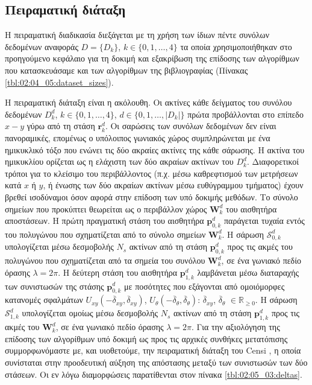 \subsection{Πειραματική διάταξη}
\label{subsection:02_05_03:01}

Η πειραματική διαδικασία διεξάγεται με τη χρήση των ίδιων πέντε συνόλων
δεδομένων αναφοράς $D = \{D_k\}$, $k \in \{0,1,\dots,4\}$ τα οποία
χρησιμοποιήθηκαν στο προηγούμενο κεφάλαιο για τη δοκιμή και εξακρίβωση της
επίδοσης των αλγορίθμων που κατασκευάσαμε και των αλγορίθμων της βιβλιογραφίας
(Πίνακας \ref{tbl:02:04_05:dataset_sizes}).

Η πειραματική διάταξη είναι η ακόλουθη. Οι ακτίνες κάθε δείγματος του συνόλου
δεδομένων $D_k^d$, $k \in \{0,1,\dots,4\}$, $d \in \{0,1,\dots,|D_k|\}$ πρώτα
προβάλλονται στο επίπεδο $x-y$ γύρω από τη στάση $\bm{r}_k^d$. Οι σαρώσεις των
συνόλων δεδομένων δεν είναι πανοραμικές, επομένως ο υπόλοιπος γωνιακός χώρος
συμπληρώνεται με ένα ημικυκλικό τόξο που ενώνει τις δύο ακραίες ακτίνες της
κάθε σάρωσης. Η ακτίνα του ημικυκλίου ορίζεται ως η ελάχιστη των δύο ακραίων
ακτίνων του $D_k^d$. Διαφορετικοί τρόποι για το κλείσιμο του περιβάλλοντος
(π.χ.  μέσω καθρεφτισμού των μετρήσεων κατά $x$ ή $y$, ή ένωσης των δύο ακραίων
ακτίνων μέσω ευθύγραμμου τμήματος) έχουν βρεθεί ισοδύναμοι όσον αφορά στην
επίδοση των υπό δοκιμής μεθόδων. Το σύνολο σημείων που προκύπτει θεωρείται ως ο
περιβάλλον χώρος $\bm{W}_k^d$ του αισθητήρα αποστάσεων. Η πρώτη πραγματική
στάση του αισθητήρα $\bm{p}_{0,k}^d$ παράγεται τυχαία εντός του πολυγώνου που
σχηματίζεται από το σύνολο σημείων $\bm{W}_k^d$. Η σάρωση $\mathcal{S}_{0,k}^d$
υπολογίζεται μέσω δεσμοβολής $N_s$ ακτίνων από τη στάση $\bm{p}_{0,k}^d$ προς
τις ακμές του πολυγώνου που σχηματίζεται από τα σημεία του συνόλου
$\bm{W}_k^d$, σε ένα γωνιακό πεδίο όρασης $\lambda = 2\pi$. Η δεύτερη στάση του
αισθητήρα $\bm{p}_{1,k}^d$ λαμβάνεται μέσω διαταραχής των συνιστωσών της στάσης
$\bm{p}^d_{0,k}$ με ποσότητες που εξάγονται από ομοιόμορφες κατανομές σφαλμάτων
$U_{xy}(-\overline{\delta}_{xy}, \overline{\delta}_{xy})$,
$U_{\theta}(-\overline{\delta}_{\theta}, \overline{\delta}_{\theta})$:
$\overline{\delta}_{xy}$, $\overline{\delta}_\theta$ $\in \mathbb{R}_{\geq 0}$.
Η σάρωση $\mathcal{S}_{1,k}^d$ υπολογίζεται ομοίως μέσω δεσμοβολής $N_s$
ακτίνων από τη στάση $\bm{p}_{1,k}^d$ προς τις ακμές του $\bm{W}_k^d$, σε ένα
γωνιακό πεδίο όρασης $\lambda = 2\pi$.  Για την αξιολόγηση της επίδοσης των
αλγορίθμων υπό δοκιμή ως προς τις αρχικές συνθήκες μετατόπισης συμμορφωνόμαστε
με, και υιοθετούμε, την πειραματική διάταξη του Censi \cite{Censi2008a}, η
οποία συνίσταται στην προοδευτική αύξηση της απόστασης μεταξύ των συνιστωσών
των δύο στάσεων. Οι εν λόγω διαμορφώσεις παρατίθενται στον πίνακα
\ref{tbl:02:05_03:deltas}.


